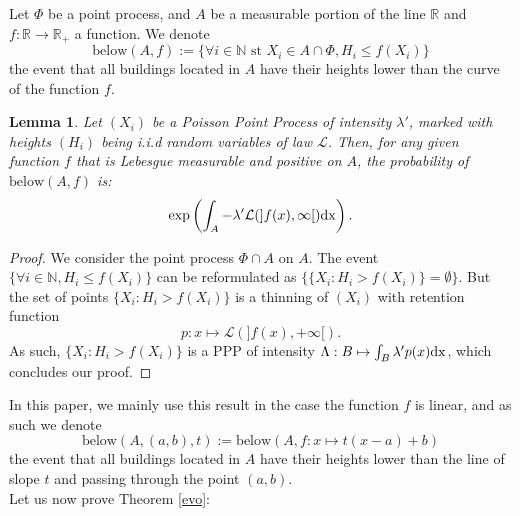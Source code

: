 \documentclass[10pt,english,a4paper]{smfart}
\newtheorem{lemma}{Lemma}[theorem]
\theoremstyle{definition}
\theoremstyle{remark}
\newcommand{\R}{\mathbb{R}}
\newcommand{\N}{\mathbb{N}}
\newcommand{\below}[3]{\mathrm{below}\left(#1, #2, #3\right)}
\newcommand{\belowa}[2]{\mathrm{below}\left(#1, #2\right)}
\begin{document}
Let $\Phi$ be a point process, and $A$ be a measurable portion of the line $\R$ and $f:\R\rightarrow \R_+$ a function. We denote \[\belowa{A}{f}:=\{\forall i \in \N\text{ st }X_i\in A\cap\Phi, H_i\leq f(X_i)\}\] the event that all buildings located in $A$ have their heights lower than the curve of the function $f$.

\begin{lemma}\label{dessous_diago}
    Let $(X_i)$ be a Poisson Point Process of intensity $\lambda'$, marked with heights $(H_i)$ being i.i.d random variables of law $\mathcal{L}$. Then, for any given function $f$ that is Lebesgue measurable and positive on $A$, the probability of $\belowa{A}{f}$ is:
    \[\exp \left(\int_A -\lambda' \mathcal{L}(]f(x), \infty[) \rm{d}x\right) .\]
\end{lemma}

\begin{proof}
We consider the point process $\Phi\cap A$  on $A$. The event $\{\forall i \in \N, H_i\leq f(X_i)\}$ can be reformulated as $\{\{X_i : H_i> f(X_i)\} = \emptyset\}$. But the set of points $\{X_i : H_i> f(X_i)\}$ is a thinning of $(X_i)$ with retention function 
\[p:x \mapsto \mathcal{L}(]f(x), +\infty[).\]
As such, $\{X_i : H_i> f(X_i)\}$ is a PPP of intensity $\Lambda: B \mapsto \int_B \lambda'p(x)\rm{d}x$, which concludes our proof.
\end{proof}

In this paper, we mainly use this result in the case the function $f$ is linear, and as such we denote
\[\below{A}{(a, b)}{t}:=\belowa{A}{f: x\mapsto t(x-a)+b}\] 
the event that all buildings located in $A$ have their heights lower than the line of slope $t$ and passing through the point $(a, b)$.\\
Let us now prove Theorem \ref{evo}:
\end{document}
